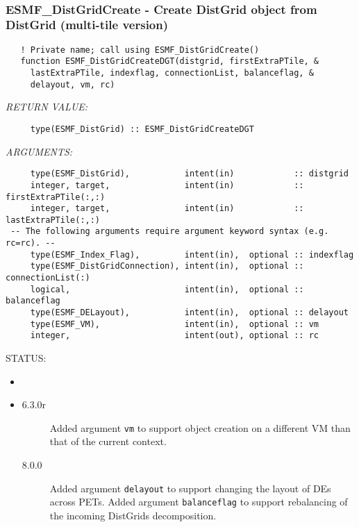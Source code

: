  
\mbox{}\hrulefill\ 
 
\subsubsection [ESMF\_DistGridCreate] {ESMF\_DistGridCreate - Create DistGrid object from DistGrid (multi-tile version)}


 
\begin{verbatim}   ! Private name; call using ESMF_DistGridCreate()
   function ESMF_DistGridCreateDGT(distgrid, firstExtraPTile, &
     lastExtraPTile, indexflag, connectionList, balanceflag, &
     delayout, vm, rc)
           \end{verbatim}{\em RETURN VALUE:}
\begin{verbatim}     type(ESMF_DistGrid) :: ESMF_DistGridCreateDGT\end{verbatim}{\em ARGUMENTS:}
\begin{verbatim}     type(ESMF_DistGrid),           intent(in)            :: distgrid
     integer, target,               intent(in)            :: firstExtraPTile(:,:)
     integer, target,               intent(in)            :: lastExtraPTile(:,:)
 -- The following arguments require argument keyword syntax (e.g. rc=rc). --
     type(ESMF_Index_Flag),         intent(in),  optional :: indexflag
     type(ESMF_DistGridConnection), intent(in),  optional :: connectionList(:)
     logical,                       intent(in),  optional :: balanceflag
     type(ESMF_DELayout),           intent(in),  optional :: delayout
     type(ESMF_VM),                 intent(in),  optional :: vm
     integer,                       intent(out), optional :: rc\end{verbatim}
{\sf STATUS:}
   \begin{itemize}
   \item{}
   \item{}
   \begin{description}
   \item[6.3.0r] Added argument {\tt vm} to support object creation on a
                 different VM than that of the current context.
   \item[8.0.0] Added argument {\tt delayout} to support changing the layout of
                DEs across PETs.\newline
                Added argument {\tt balanceflag} to support rebalancing of the
                incoming DistGrids decomposition.
   \end{description}
   \end{itemize}
  
